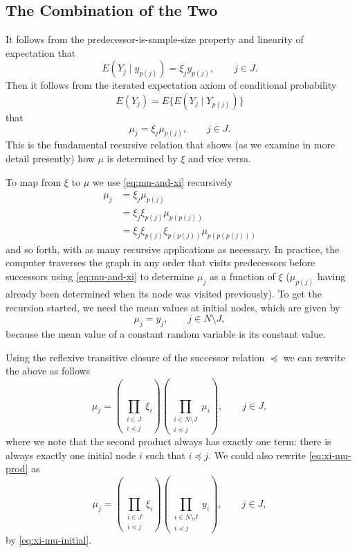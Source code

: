 \subsection{The Combination of the Two}
\label{sec:mu-and-xi}

It follows from the predecessor-is-sample-size property and linearity of
expectation that
\begin{equation} \label{eq:cond-exp}
   E(Y_j \mid y_{p(j)}) = \xi_j y_{p(j)}, \qquad j \in J.
\end{equation}
Then it follows from the iterated expectation axiom of conditional probability
$$
   E(Y_j)
   =
   E\{E(Y_j \mid Y_{p(j)})\}
$$
that
\begin{equation} \label{eq:mu-and-xi}
   \mu_j = \xi_j \mu_{p(j)}, \qquad j \in J.
\end{equation}
This is the fundamental recursive relation that shows (as we examine in
more detail presently) how $\mu$ is determined by $\xi$ and vice versa.

To map from $\xi$ to $\mu$ we use \eqref{eq:mu-and-xi} recursively
\begin{align*}
   \mu_j
   & =
   \xi_j \mu_{p(j)}
   \\
   & =
   \xi_j \xi_{p(j)} \mu_{p(p(j))}
   \\
   & =
   \xi_j \xi_{p(j)} \xi_{p(p(j))} \mu_{p(p(p(j)))}
\end{align*}
and so forth, with as many recursive applications as necessary.  In practice,
the computer traverses the graph in any order that visits predecessors before
successors using \eqref{eq:mu-and-xi} to determine $\mu_j$ as a function of
$\xi$ ($\mu_{p(j)}$ having already been determined when its node was visited
previously).  To get the recursion started, we need the mean values at initial
nodes, which are given by
\begin{equation} \label{eq:xi-mu-initial}
   \mu_j = y_j, \qquad j \in N \setminus J,
\end{equation}
because the mean value of a constant random variable is its constant value.

Using the reflexive transitive closure of the successor relation $\preceq$
we can rewrite the above as follows
\begin{equation} \label{eq:xi-mu-prod}
    \mu_j
    =
    \left( \prod_{\substack{i \in J \\ i \preceq j}} \xi_i \right)
    \left( \prod_{\substack{i \in N \setminus J \\ i \preceq j}} \mu_i \right),
    \qquad j \in J,
\end{equation}
where we note that the second product always has exactly one term: there
is always exactly one initial node $i$ such that $i \preceq j$.
We could also rewrite \eqref{eq:xi-mu-prod} as
\begin{equation} \label{eq:xi-mu-prod-too}
    \mu_j
    =
    \left( \prod_{\substack{i \in J \\ i \preceq j}} \xi_i \right)
    \left( \prod_{\substack{i \in N \setminus J \\ i \preceq j}} y_i \right),
    \qquad j \in J,
\end{equation}
by \eqref{eq:xi-mu-initial}.

